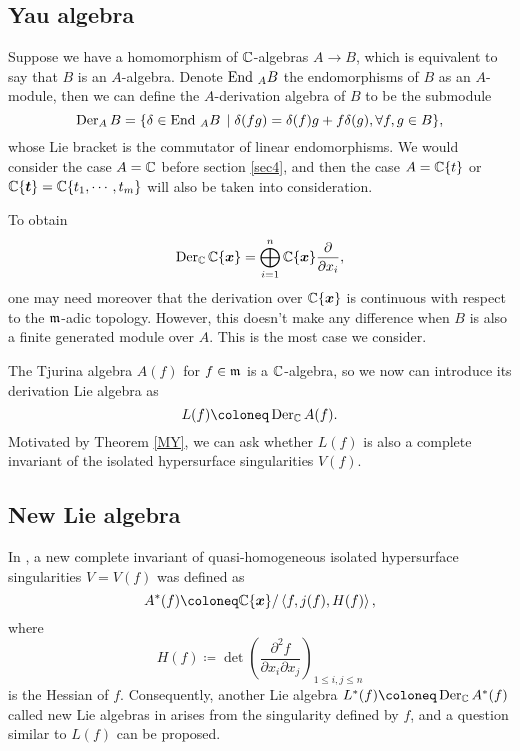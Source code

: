 \subsection{Yau algebra}\label{sec-2.3}
Suppose we have a homomorphism of ${\mathbb{C}}$-algebras  $A\to B$, which is equivalent to say that $B$ is an $A$-algebra.  Denote $\operatorname{End}\,_A B$ the endomorphisms of $B$ as an $A$-module, then we can define the $A$-derivation algebra of $B$ to be the submodule
\[\operatorname{Der}_A B=\{ \delta \in \operatorname{End}\,_A B\,\mid \delta(fg)= \delta(f)g+f\delta(g), \forall f,g \in B\},\]
whose Lie bracket is the commutator of linear endomorphisms. We would consider  the case $A={\mathbb{C}}$ before section \ref{sec4}, and then the case $A={\mathbb{C}}\{t\}$ or ${\mathbb{C}}\{{\boldsymbol t}\}={\mathbb{C}}\{t_1,\cdots, t_m\}$ will also be taken into consideration.
\begin{remark}
  To obtain
  \[\operatorname{Der}_{\mathbb{C}} {\mathbb{C}}\{{\boldsymbol{x}}\} = \bigoplus_{i=1}^n{\mathbb{C}}\{{\boldsymbol{x}}\} \frac{\partial }{\partial x_i},\]
  one may need moreover that the derivation over ${\mathbb{C}}\{{\boldsymbol{x}}\}$ is continuous with respect to the $\mathfrak m$-adic topology. However, this doesn't make any difference when $B$ is also a  finite generated module over $A$. This is the most case we consider. 
\end{remark}

The Tjurina algebra $A(f)$ for $f\in \mathfrak m$ is a ${\mathbb{C}}$-algebra, so we now can introduce its derivation Lie algebra as
\[L(f)\coloneq  \Der_\Cc A(f).\]
Motivated by Theorem \ref{MY}, we can ask whether  $L(f)$ is also a complete invariant of the isolated hypersurface singularities $V(f)$.	

\subsection{New Lie algebra}\label{sec-2.4}
In \cite{BN}, a new complete invariant of quasi-homogeneous isolated hypersurface singularities $V=V(f)$ was defined as
\[A^*(f)\coloneq \Cc\{\xn\}/\lan f, j(f), H(f)\ran,\]
where
\[H(f)\coloneq \det  \left( \frac{\partial^2 f}{\partial x_i \partial x_j}\right)_{1\leqslant i,j \leqslant n } \]
is the Hessian of $f$. Consequently, another Lie algebra $L^*(f)\coloneq \Der_\Cc A^*(f)$ called new Lie algebras in \cite{BN} arises from the singularity defined by $f$, and a question similar to $L(f)$ can be proposed.

